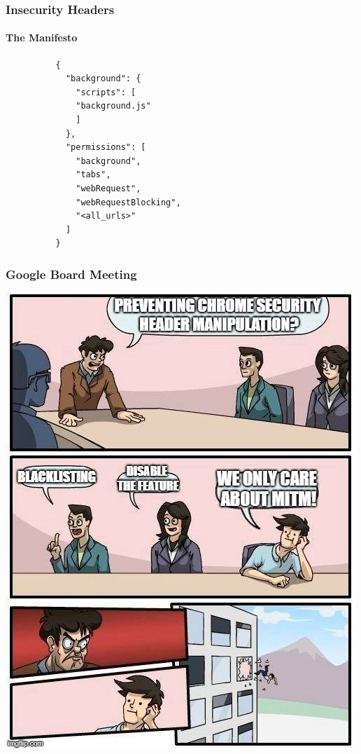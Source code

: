 \documentclass[aspectratio=169]{beamer}
\begin{document}
\begin{frame}[fragile]{}
  \frametitle{Insecurity Headers}
  \framesubtitle{The Manifesto}
  \begin{center}
    \begin{minipage}{0.5\textwidth}
      \begin{tcolorbox}[title=manifest.json,colback=black]
        \begin{verbatim}
          {
            "background": {
              "scripts": [
              "background.js"
              ]
            },
            "permissions": [
              "background",
              "tabs",
              "webRequest",
              "webRequestBlocking",
              "<all_urls>"
            ]
          }
        \end{verbatim}
      \end{tcolorbox}
    \end{minipage}
  \end{center}
\end{frame}
\begin{frame}
  \frametitle{Google Board Meeting}
  \begin{center}
    \includegraphics[scale=0.32]{out_the_window}
  \end{center}
\end{frame}
\end{document}
